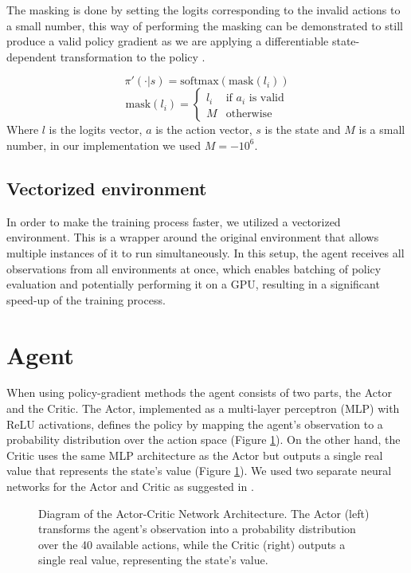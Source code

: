 The masking is done by setting the logits corresponding to the invalid actions to a small number, this way of performing the masking can be demonstrated to still produce a valid policy gradient as we are applying a differentiable state-dependent transformation to the policy \cite{action-masking}.

\begin{equation*}
    \pi'(\cdot|s) = \mathrm{softmax}(\mathrm{mask}(l_i))
\end{equation*}
\begin{equation*}
    \mathrm{mask}(l_{i}) = \begin{cases}
        l_i & \text{if $a_i$ is valid} \\
        M & \text{otherwise}
    \end{cases}
\end{equation*}
Where $l$ is the logits vector, $a$ is the action vector, $s$ is the state and $M$ is a small number, in our implementation we used $M=-10^6$.

\subsection{Vectorized environment}
In order to make the training process faster, we utilized a vectorized environment. This is a wrapper around the original environment that allows multiple instances of it to run simultaneously. In this setup, the agent receives all observations from all environments at once, which enables batching of policy evaluation and potentially performing it on a GPU, resulting in a significant speed-up of the training process.

\section{Agent}
When using policy-gradient methods the agent consists of two parts, the Actor and the Critic. The Actor, implemented as a multi-layer perceptron (MLP) with ReLU activations, defines the policy by mapping the agent's observation to a probability distribution over the action space (Figure \ref{fig:actor-critic-network}). On the other hand, the Critic uses the same MLP architecture as the Actor but outputs a single real value that represents the state's value (Figure \ref{fig:actor-critic-network}). We used two separate neural networks for the Actor and Critic as suggested in \cite{ppo-implementation-details}.

\begin{figure}[H]
    \centering
    
    \caption{Diagram of the Actor-Critic Network Architecture. The Actor (left) transforms the agent's observation into a probability distribution over the 40 available actions, while the Critic (right) outputs a single real value, representing the state's value.}
    \label{fig:actor-critic-network}
\end{figure}

